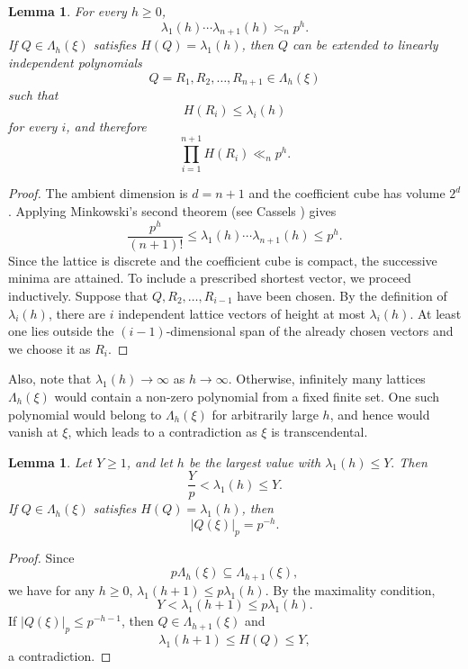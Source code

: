 \documentclass[10pt,a4paper]{amsart}
\newtheorem{lemma}[theorem]{Lemma}
\begin{document}
\begin{lemma}\label{lem:lattice-minima}
For every $h\geq0$,
$$
\lambda_1(h)\cdots\lambda_{n+1}(h)\asymp_n p^h.
$$
If $Q\in\Lambda_h(\xi)$ satisfies $H(Q)=\lambda_1(h)$, then $Q$ can be extended to linearly independent polynomials
$$
Q=R_1,R_2,\ldots,R_{n+1}\in\Lambda_h(\xi)
$$
such that
$$
H(R_i)\leq\lambda_i(h)
$$
for every $i$, and therefore
$$
\prod_{i=1}^{n+1}H(R_i)\ll_n p^h.
$$
\end{lemma}

\begin{proof}
The ambient dimension is $d=n+1$ and the coefficient cube has volume $2^d$.
Applying Minkowski's second theorem (see Cassels
\cite[Chapter~VIII]{Cassels}) gives
$$
\frac{p^h}{(n+1)!}
\leq
\lambda_1(h)\cdots\lambda_{n+1}(h)
\leq
p^h.
$$
Since the lattice is discrete and the coefficient cube is compact, the successive minima are attained. To include a prescribed shortest vector, we proceed inductively. Suppose that $Q,R_2,\ldots,R_{i-1}$ have been chosen. By the definition of $\lambda_i(h)$, there are $i$ independent lattice vectors of height at most $\lambda_i(h)$. At least one lies outside the $(i-1)$-dimensional span of the already chosen vectors and we choose it as $R_i$.
\end{proof}

Also, note that $\lambda_1(h)\longrightarrow\infty$ as $h\to\infty$. Otherwise, infinitely many lattices $\Lambda_h(\xi)$ would contain a non-zero polynomial from a fixed finite set. One such polynomial would belong to $\Lambda_h(\xi)$ for arbitrarily large $h$, and hence would vanish at $\xi$, which leads to a contradiction as $\xi$ is transcendental. 

\begin{lemma}\label{lem:shortest-vector}
Let $Y\geq1$, and let $h$ be the largest value with $\lambda_1(h)\leq Y.$ Then
$$
\frac{Y}{p}<\lambda_1(h)\leq Y.
$$
If $Q\in\Lambda_h(\xi)$ satisfies $H(Q)=\lambda_1(h)$, then
$$
|Q(\xi)|_p=p^{-h}.
$$
\end{lemma}

\begin{proof}
Since
$$
p\Lambda_h(\xi)\subseteq\Lambda_{h+1}(\xi),
$$
we have for any $h\geq 0$, $\lambda_1(h+1)\leq p\lambda_1(h)$. By the maximality condition,
$$
Y<\lambda_1(h+1)\leq p\lambda_1(h).
$$
If $|Q(\xi)|_p\leq p^{-h-1}$, then $Q\in\Lambda_{h+1}(\xi)$ and
$$
\lambda_1(h+1)\leq H(Q)\leq Y,
$$
a contradiction.
\end{proof}
\medskip

\end{document}
